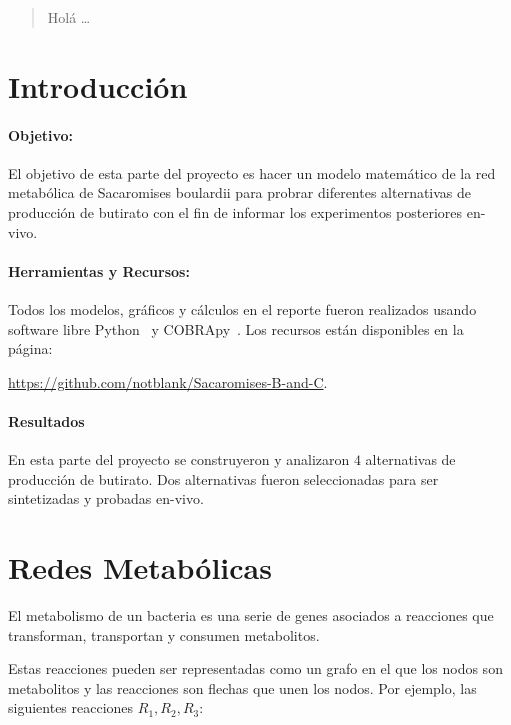 \documentclass[12pt,spanish]{article}
\begin{document}
\maketitle

\begin{abstract}
Holá \ldots
\end{abstract}

\section{Introducción}

\paragraph{Objetivo:} El objetivo de esta parte del proyecto es hacer un modelo matemático de la red metabólica de Sacaromises boulardii para probrar diferentes alternativas de producción de butirato con el fin de informar los experimentos posteriores en-vivo.

\paragraph{Herramientas y Recursos:} Todos los modelos, gráficos y cálculos en el reporte fueron realizados usando software libre Python~\cite{python} y COBRApy~\cite{COBRApy}. Los recursos están disponibles en la página:

\begin{center}
  \href{https://github.com/notblank/Sacaromises-B-and-C}{https://github.com/notblank/Sacaromises-B-and-C}.
\end{center}

\paragraph{Resultados}
En esta parte del proyecto se construyeron y analizaron $4$ alternativas de producción de butirato. Dos alternativas fueron seleccionadas para ser sintetizadas y probadas en-vivo.

\section{Redes Metabólicas}
El metabolismo de un bacteria es una serie de genes asociados a reacciones que transforman, transportan y consumen metabolitos.

\par
Estas reacciones pueden ser representadas como un grafo en el que los nodos son metabolitos y las reacciones son flechas que unen los nodos. Por ejemplo, las siguientes reacciones $R_1, R_2, R_3$:
\end{document}
